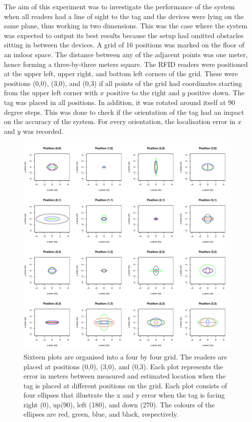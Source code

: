 The aim of this experiment was to investigate the performance of the system when all readers had a line of sight to the tag and the devices were lying on the same plane, thus working in two dimensions. This was the case where the system was expected to output its best results because the setup had omitted obstacles sitting in between the devices. A grid of 16 positions was marked on the floor of an indoor space. The distance between any of the adjacent points was one meter, hence forming a three-by-three meters square. The RFID readers were positioned at the upper left, upper right, and bottom left corners of the grid. These were positions (0,0), (3,0), and (0,3) if all points of the grid had coordinates starting from the upper left corner with $x$ positive to the right and $y$ positive down. The tag was placed in all positions. In addition, it was rotated around itself at 90 degree steps. This was done to check if the orientation of the tag had an impact on the accuracy of the system. For every orientation, the localisation error in $x$ and $y$ was recorded.
\begin{figure}[H]
	\begin{center}
		\includegraphics[width=1\textwidth]{figures/error_distance_grid}
		\caption{Sixteen plots are organised into a four by four grid. The readers are placed at positions (0,0), (3,0), and (0,3). Each plot represents the error in meters between measured and estimated location when the tag is placed at different positions on the grid. Each plot consists of four ellipses that illustrate the x and y error when the tag is facing right (0\textdegree), up(90\textdegree), left (180\textdegree), and down (270\textdegree). The colours of the ellipses are red, green, blue, and black, respectively.}
		\label{fig:errorlos}
	\end{center}
\end{figure}

